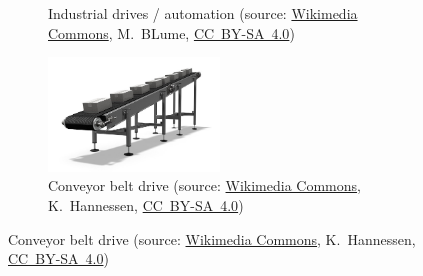 \begin{frame}[c]
\begin{figure}
\begin{subfigure}[b]{0.49\textwidth}
			\caption{Industrial drives / automation (source: \href{https://de.m.wikipedia.org/wiki/Datei:Paris_Motor_Show_2018,_Paris_\%281Y7A1752\%29.jpg}{Wikimedia Commons}, M.~BLume, \href{https://creativecommons.org/licenses/by-sa/4.0/deed.de}{CC~BY-SA~4.0})}
		\end{subfigure}
		\hfill
		\begin{subfigure}[b]{0.49\textwidth}
			\centering
			\includegraphics[width=0.5\textwidth]{fig/lec01/Conveyor.jpg}
			\caption{Conveyor belt drive (source: \href{https://commons.wikimedia.org/wiki/File:Inclined-belt_conveyor.jpgg}{Wikimedia Commons},  	K.~Hannessen, \href{https://creativecommons.org/licenses/by-sa/4.0/deed.en}{CC~BY-SA~4.0})}
		\end{subfigure}
	\end{figure}
\end{frame}

